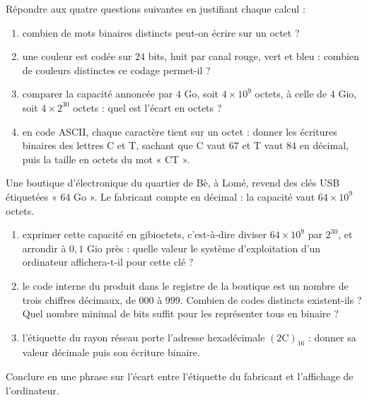 \begin{exercice}
Répondre aux quatre questions suivantes en justifiant chaque calcul :
\begin{enumerate}
\item combien de mots binaires distincts peut-on écrire sur un octet ?
\item une couleur est codée sur $24$ bits, huit par canal rouge, vert et bleu : combien de couleurs distinctes ce codage permet-il ?
\item comparer la capacité annoncée par $4$ Go, soit $4 \times 10^9$ octets, à celle de $4$ Gio, soit $4 \times 2^{30}$ octets : quel est l'écart en octets ?
\item en code ASCII, chaque caractère tient sur un octet : donner les écritures binaires des lettres C et T, sachant que C vaut $67$ et T vaut $84$ en décimal, puis la taille en octets du mot « CT ».
\end{enumerate}
\end{exercice}

\begin{exercice}
Une boutique d'électronique du quartier de Bè, à Lomé, revend des clés USB étiquetées « 64 Go ». Le fabricant compte en décimal : la capacité vaut $64 \times 10^9$ octets.
\begin{enumerate}
\item exprimer cette capacité en gibioctets, c'est-à-dire diviser $64 \times 10^9$ par $2^{30}$, et arrondir à $0{,}1$ Gio près : quelle valeur le système d'exploitation d'un ordinateur affichera-t-il pour cette clé ?
\item le code interne du produit dans le registre de la boutique est un nombre de trois chiffres décimaux, de $000$ à $999$. Combien de codes distincts existent-ils ? Quel nombre minimal de bits suffit pour les représenter tous en binaire ?
\item l'étiquette du rayon réseau porte l'adresse hexadécimale $(2\mathrm{C})_{16}$ : donner sa valeur décimale puis son écriture binaire.
\end{enumerate}
Conclure en une phrase sur l'écart entre l'étiquette du fabricant et l'affichage de l'ordinateur.
\end{exercice}
